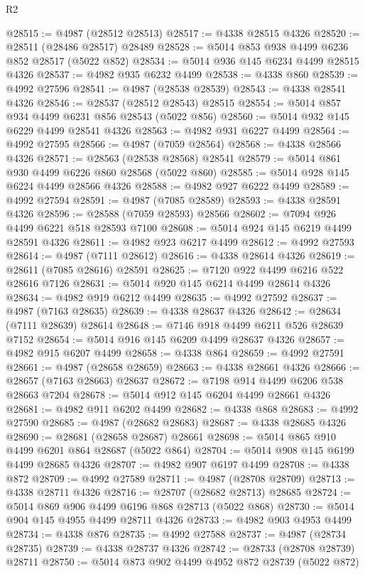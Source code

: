 \begin{lexlean}{R2}
\begin{coremodule}
@28515 := @4987 (@28512 @28513)
@28517 := @4338 @28515 @4326
@28520 := @28511 (@28486 @28517) @28489
@28528 := @5014 @853 @938 @4499 @6236 @852 @28517 (@5022 @852)
@28534 := @5014 @936 @145 @6234 @4499 @28515 @4326
@28537 := @4982 @935 @6232 @4499
@28538 := @4338 @860
@28539 := @4992 @27596
@28541 := @4987 (@28538 @28539)
@28543 := @4338 @28541 @4326
@28546 := @28537 (@28512 @28543) @28515
@28554 := @5014 @857 @934 @4499 @6231 @856 @28543 (@5022 @856)
@28560 := @5014 @932 @145 @6229 @4499 @28541 @4326
@28563 := @4982 @931 @6227 @4499
@28564 := @4992 @27595
@28566 := @4987 (@7059 @28564)
@28568 := @4338 @28566 @4326
@28571 := @28563 (@28538 @28568) @28541
@28579 := @5014 @861 @930 @4499 @6226 @860 @28568 (@5022 @860)
@28585 := @5014 @928 @145 @6224 @4499 @28566 @4326
@28588 := @4982 @927 @6222 @4499
@28589 := @4992 @27594
@28591 := @4987 (@7085 @28589)
@28593 := @4338 @28591 @4326
@28596 := @28588 (@7059 @28593) @28566
@28602 := @7094 @926 @4499 @6221 @518 @28593 @7100
@28608 := @5014 @924 @145 @6219 @4499 @28591 @4326
@28611 := @4982 @923 @6217 @4499
@28612 := @4992 @27593
@28614 := @4987 (@7111 @28612)
@28616 := @4338 @28614 @4326
@28619 := @28611 (@7085 @28616) @28591
@28625 := @7120 @922 @4499 @6216 @522 @28616 @7126
@28631 := @5014 @920 @145 @6214 @4499 @28614 @4326
@28634 := @4982 @919 @6212 @4499
@28635 := @4992 @27592
@28637 := @4987 (@7163 @28635)
@28639 := @4338 @28637 @4326
@28642 := @28634 (@7111 @28639) @28614
@28648 := @7146 @918 @4499 @6211 @526 @28639 @7152
@28654 := @5014 @916 @145 @6209 @4499 @28637 @4326
@28657 := @4982 @915 @6207 @4499
@28658 := @4338 @864
@28659 := @4992 @27591
@28661 := @4987 (@28658 @28659)
@28663 := @4338 @28661 @4326
@28666 := @28657 (@7163 @28663) @28637
@28672 := @7198 @914 @4499 @6206 @538 @28663 @7204
@28678 := @5014 @912 @145 @6204 @4499 @28661 @4326
@28681 := @4982 @911 @6202 @4499
@28682 := @4338 @868
@28683 := @4992 @27590
@28685 := @4987 (@28682 @28683)
@28687 := @4338 @28685 @4326
@28690 := @28681 (@28658 @28687) @28661
@28698 := @5014 @865 @910 @4499 @6201 @864 @28687 (@5022 @864)
@28704 := @5014 @908 @145 @6199 @4499 @28685 @4326
@28707 := @4982 @907 @6197 @4499
@28708 := @4338 @872
@28709 := @4992 @27589
@28711 := @4987 (@28708 @28709)
@28713 := @4338 @28711 @4326
@28716 := @28707 (@28682 @28713) @28685
@28724 := @5014 @869 @906 @4499 @6196 @868 @28713 (@5022 @868)
@28730 := @5014 @904 @145 @4955 @4499 @28711 @4326
@28733 := @4982 @903 @4953 @4499
@28734 := @4338 @876
@28735 := @4992 @27588
@28737 := @4987 (@28734 @28735)
@28739 := @4338 @28737 @4326
@28742 := @28733 (@28708 @28739) @28711
@28750 := @5014 @873 @902 @4499 @4952 @872 @28739 (@5022 @872)

\end{coremodule}
\end{lexlean}
